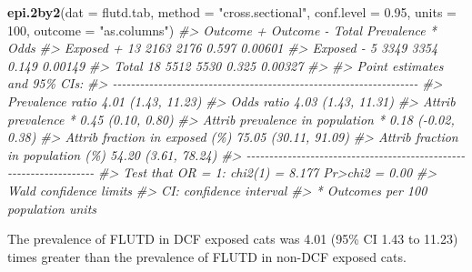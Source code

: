 \documentclass[
]{article}
\newenvironment{Shaded}{\begin{snugshade}}{\end{snugshade}}
\newcommand{\CommentTok}[1]{\textcolor[rgb]{0.56,0.35,0.01}{\textit{#1}}}
\newcommand{\DataTypeTok}[1]{\textcolor[rgb]{0.13,0.29,0.53}{#1}}
\newcommand{\DecValTok}[1]{\textcolor[rgb]{0.00,0.00,0.81}{#1}}
\newcommand{\FloatTok}[1]{\textcolor[rgb]{0.00,0.00,0.81}{#1}}
\newcommand{\KeywordTok}[1]{\textcolor[rgb]{0.13,0.29,0.53}{\textbf{#1}}}
\newcommand{\NormalTok}[1]{#1}
\newcommand{\StringTok}[1]{\textcolor[rgb]{0.31,0.60,0.02}{#1}}
\begin{document}
\begin{Shaded}
\begin{Highlighting}[]
\KeywordTok{epi.2by2}\NormalTok{(}\DataTypeTok{dat =}\NormalTok{ flutd.tab, }\DataTypeTok{method =} \StringTok{"cross.sectional"}\NormalTok{, }\DataTypeTok{conf.level =} \FloatTok{0.95}\NormalTok{, }
   \DataTypeTok{units =} \DecValTok{100}\NormalTok{, }\DataTypeTok{outcome =} \StringTok{"as.columns"}\NormalTok{)}
\CommentTok{\#\textgreater{}              Outcome +    Outcome {-}      Total        Prevalence *        Odds}
\CommentTok{\#\textgreater{} Exposed +           13         2163       2176               0.597     0.00601}
\CommentTok{\#\textgreater{} Exposed {-}            5         3349       3354               0.149     0.00149}
\CommentTok{\#\textgreater{} Total               18         5512       5530               0.325     0.00327}
\CommentTok{\#\textgreater{} }
\CommentTok{\#\textgreater{} Point estimates and 95\% CIs:}
\CommentTok{\#\textgreater{} {-}{-}{-}{-}{-}{-}{-}{-}{-}{-}{-}{-}{-}{-}{-}{-}{-}{-}{-}{-}{-}{-}{-}{-}{-}{-}{-}{-}{-}{-}{-}{-}{-}{-}{-}{-}{-}{-}{-}{-}{-}{-}{-}{-}{-}{-}{-}{-}{-}{-}{-}{-}{-}{-}{-}{-}{-}{-}{-}{-}{-}{-}{-}{-}{-}{-}{-}}
\CommentTok{\#\textgreater{} Prevalence ratio                             4.01 (1.43, 11.23)}
\CommentTok{\#\textgreater{} Odds ratio                                   4.03 (1.43, 11.31)}
\CommentTok{\#\textgreater{} Attrib prevalence *                          0.45 (0.10, 0.80)}
\CommentTok{\#\textgreater{} Attrib prevalence in population *            0.18 ({-}0.02, 0.38)}
\CommentTok{\#\textgreater{} Attrib fraction in exposed (\%)              75.05 (30.11, 91.09)}
\CommentTok{\#\textgreater{} Attrib fraction in population (\%)           54.20 (3.61, 78.24)}
\CommentTok{\#\textgreater{} {-}{-}{-}{-}{-}{-}{-}{-}{-}{-}{-}{-}{-}{-}{-}{-}{-}{-}{-}{-}{-}{-}{-}{-}{-}{-}{-}{-}{-}{-}{-}{-}{-}{-}{-}{-}{-}{-}{-}{-}{-}{-}{-}{-}{-}{-}{-}{-}{-}{-}{-}{-}{-}{-}{-}{-}{-}{-}{-}{-}{-}{-}{-}{-}{-}{-}{-}}
\CommentTok{\#\textgreater{}  Test that OR = 1: chi2(1) = 8.177 Pr\textgreater{}chi2 = 0.00}
\CommentTok{\#\textgreater{}  Wald confidence limits}
\CommentTok{\#\textgreater{}  CI: confidence interval}
\CommentTok{\#\textgreater{}  * Outcomes per 100 population units}
\end{Highlighting}
\end{Shaded}

The prevalence of FLUTD in DCF exposed cats was 4.01 (95\% CI 1.43 to
11.23) times greater than the prevalence of FLUTD in non-DCF exposed
cats.
\end{document}
